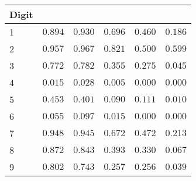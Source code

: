 \begin{table}[!tbp]
\begin{center}
\begin{tabular}{lrrrrr}
\hline\hline
\multicolumn{1}{l}{Digit}&\multicolumn{1}{c}{}&\multicolumn{1}{c}{}&\multicolumn{1}{c}{}&\multicolumn{1}{c}{}&\multicolumn{1}{c}{}\tabularnewline
\hline
1&$0.894$&$0.930$&$0.696$&$0.460$&$0.186$\tabularnewline
2&$0.957$&$0.967$&$0.821$&$0.500$&$0.599$\tabularnewline
3&$0.772$&$0.782$&$0.355$&$0.275$&$0.045$\tabularnewline
4&$0.015$&$0.028$&$0.005$&$0.000$&$0.000$\tabularnewline
5&$0.453$&$0.401$&$0.090$&$0.111$&$0.010$\tabularnewline
6&$0.055$&$0.097$&$0.015$&$0.000$&$0.000$\tabularnewline
7&$0.948$&$0.945$&$0.672$&$0.472$&$0.213$\tabularnewline
8&$0.872$&$0.843$&$0.393$&$0.330$&$0.067$\tabularnewline
9&$0.802$&$0.743$&$0.257$&$0.256$&$0.039$\tabularnewline
\hline
\end{tabular}\end{center}
\end{table}
